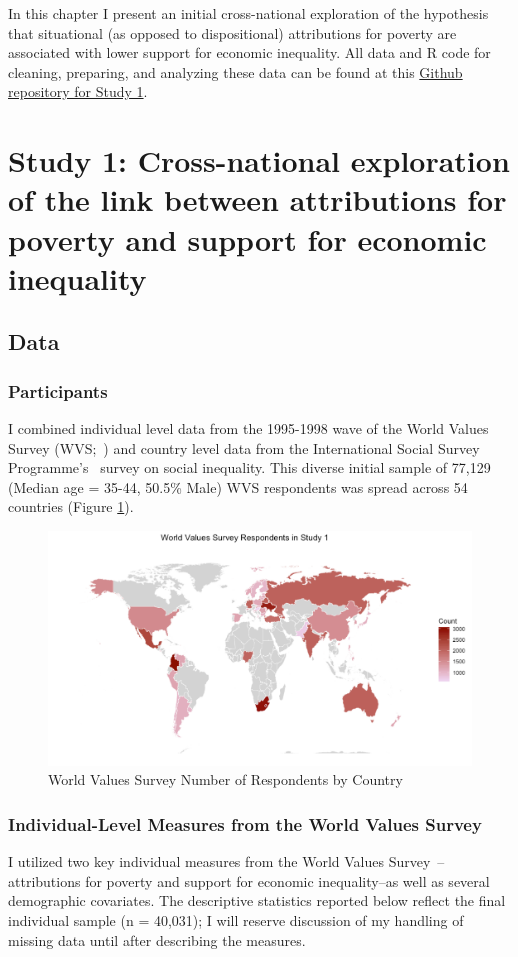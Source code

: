 \documentclass{sfuthesis}
\begin{document}
In this chapter I present an initial cross-national exploration of the hypothesis that situational (as opposed to dispositional) attributions for poverty are associated with lower support for economic inequality. All data and R code for cleaning, preparing, and analyzing these data can be found at this \href{https://github.com/dwiwad/Dissertation/tree/master/Study\%201}{Github repository for Study 1}.

\section{Study 1: Cross-national exploration of the link between attributions for poverty and support for economic inequality}

\subsection{Data}

\subsubsection{Participants} 
I combined individual level data from the 1995-1998 wave of the World Values Survey (WVS;~\cite{inglehart}) and country level data from the International Social Survey Programme’s~\cite{issp09} survey on social inequality. This diverse initial sample of 77,129 (Median age = 35-44, 50.5\% Male) WVS respondents was spread across 54 countries (Figure \ref{fig:firstfig}). 

\begin{figure}[h]
  \includegraphics[width=\linewidth]{Fig2-1.png}
  \caption{World Values Survey Number of Respondents by Country}
  \label{fig:firstfig}
\end{figure}

\subsubsection{Individual-Level Measures from the World Values Survey}
I utilized two key individual measures from the World Values Survey~\cite{inglehart}--attributions for poverty and support for economic inequality--as well as several demographic covariates. The descriptive statistics reported below reflect the final individual sample (n = 40,031); I will reserve discussion of my handling of missing data until after describing the measures.
\end{document}
